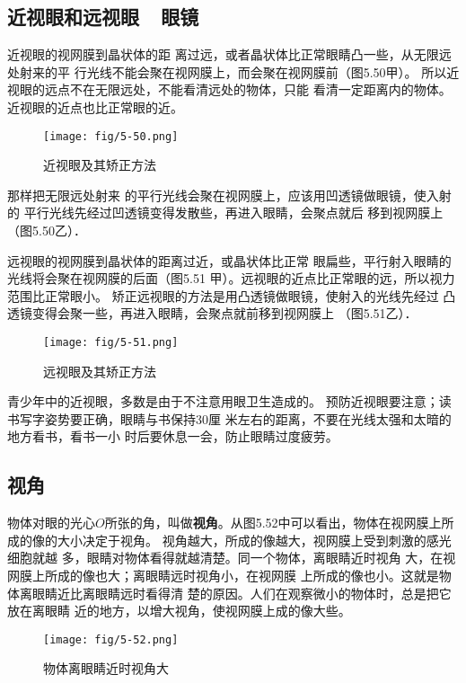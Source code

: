 \subsection{近视眼和远视眼~~眼镜}

近视眼的视网膜到晶状体的距
离过远，或者晶状体比正常眼睛凸一些，从无限远处射来的平
行光线不能会聚在视网膜上，而会聚在视网膜前（图5.50甲）。
所以近视眼的远点不在无限远处，不能看清远处的物体，只能
看清一定距离内的物体。近视眼的近点也比正常眼的近。
\begin{figure}[htp]\centering
    \texttt{[image: fig/5-50.png]}
    \caption{近视眼及其矫正方法}
    \end{figure}

    那样把无限远处射来
    的平行光线会聚在视网膜上，应该用凹透镜做眼镜，使入射的
    平行光线先经过凹透镜变得发散些，再进入眼睛，会聚点就后
    移到视网膜上（图5.50乙）．

    远视眼的视网膜到晶状体的距离过近，或晶状体比正常
    眼扁些，平行射入眼睛的光线将会聚在视网膜的后面（图5.51
    甲）。远视眼的近点比正常眼的远，所以视力范围比正常眼小。
    矫正远视眼的方法是用凸透镜做眼镜，使射入的光线先经过
    凸透镜变得会聚一些，再进入眼睛，会聚点就前移到视网膜上
    （图5.51乙）．


    \begin{figure}[htp]\centering
        \texttt{[image: fig/5-51.png]}
        \caption{远视眼及其矫正方法}
        \end{figure}

青少年中的近视眼，多数是由于不注意用眼卫生造成的。
预防近视眼要注意；读书写字姿势要正确，眼睛与书保持30厘
米左右的距离，不要在光线太强和太暗的地方看书，看书一小
时后要休息一会，防止眼睛过度疲劳。

\subsection{视角}

物体对眼的光心$O$所张的角，叫做\textbf{视角}。从图5.52中可以看出，物体在视网膜上所成的像的大小决定于视角。
视角越大，所成的像越大，视网膜上受到刺激的感光细胞就越
多，眼睛对物体看得就越清楚。同一个物体，离眼睛近时视角
大，在视网膜上所成的像也大；离眼睛远时视角小，在视网膜
上所成的像也小。这就是物体离眼睛近比离眼睛远时看得清
楚的原因。人们在观察微小的物体时，总是把它放在离眼睛
近的地方，以增大视角，使视网膜上成的像大些。

\begin{figure}[htp]\centering
    \texttt{[image: fig/5-52.png]}
    \caption{物体离眼睛近时视角大}
    \end{figure}


